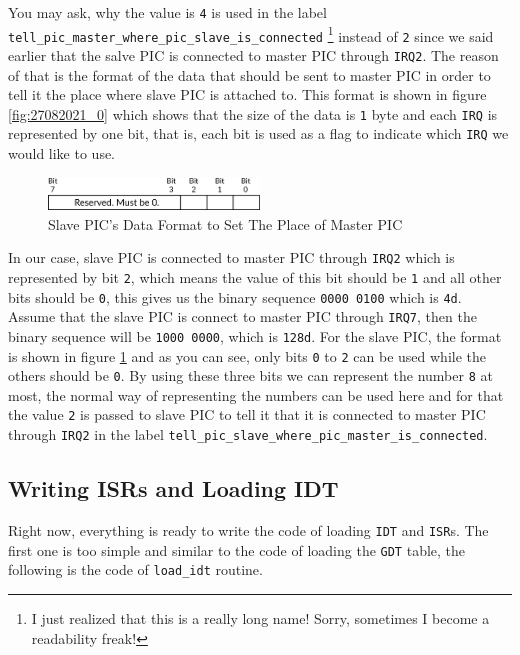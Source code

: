 You may ask, why the value is \lstinline!4! is used in the label
\lstinline!tell_pic_master_where_pic_slave_is_connected! \footnote{I
  just realized that this is a really long name! Sorry, sometimes I
  become a readability freak!} instead of \lstinline!2! since we said
earlier that the salve PIC is connected to master PIC through
\lstinline!IRQ2!. The reason of that is the format of the data that
should be sent to master PIC in order to tell it the place where slave
PIC is attached to. This format is shown in figure \ref{fig:27082021_0}
which shows that the size of the data is \lstinline!1! byte and each
\lstinline!IRQ! is represented by one bit, that is, each bit is used as
a flag to indicate which \lstinline!IRQ! we would like to use.

\begin{figure}
\centering
\includegraphics[width=0.50000\textwidth]{Figures/progenitor-ch/Fig27082021_1.png}
\caption{Slave PIC's Data Format to Set The Place of Master
PIC}\label{fig:27082021_1}
\end{figure}

In our case, slave PIC is connected to master PIC through
\lstinline!IRQ2! which is represented by bit \lstinline!2!, which means
the value of this bit should be \lstinline!1! and all other bits should
be \lstinline!0!, this gives us the binary sequence
\lstinline!0000 0100! which is \lstinline!4d!. Assume that the slave PIC
is connect to master PIC through \lstinline!IRQ7!, then the binary
sequence will be \lstinline!1000 0000!, which is \lstinline!128d!. For
the slave PIC, the format is shown in figure \ref{fig:27082021_1} and as
you can see, only bits \lstinline!0! to \lstinline!2! can be used while
the others should be \lstinline!0!. By using these three bits we can
represent the number \lstinline!8! at most, the normal way of
representing the numbers can be used here and for that the value
\lstinline!2! is passed to slave PIC to tell it that it is connected to
master PIC through \lstinline!IRQ2! in the label
\lstinline!tell_pic_slave_where_pic_master_is_connected!.

\subsection{Writing ISRs and Loading
IDT}\label{writing-isrs-and-loading-idt}

Right now, everything is ready to write the code of loading
\lstinline!IDT! and \lstinline!ISR!s. The first one is too simple and
similar to the code of loading the \lstinline!GDT! table, the following
is the code of \lstinline!load_idt! routine.

